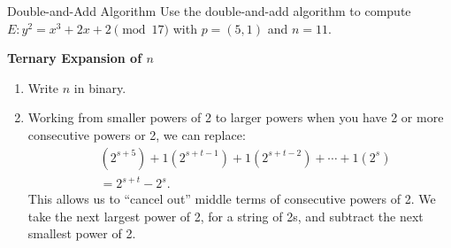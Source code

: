 \begin{example}
    {Double-and-Add Algorithm} Use the double-and-add algorithm to compute \(E \colon y^{2} = x^{3} + 2x + 2 \pmod{17}\) with \(p = (5,1)\) and \(n = 11\).
\end{example}


\begin{center}
\textbf{Ternary Expansion of \(n\)}
\end{center}

\begin{enumerate}
    \item Write \(n\) in binary.
    \item Working from smaller powers of 2 to larger powers when you have 2 or more consecutive powers or 2, we can replace: 
    \begin{align*}
        &(2^{s + 5}) + 1(2^{s + t - 1}) + 1(2^{s + t - 2}) + \cdots + 1(2^{s}) \\
        &= 2^{s + t} - 2^{s}.
    \end{align*}
    This allows us to ``cancel out'' middle terms of consecutive powers of 2. We take the next largest power of 2, for a string of 2s, and subtract the next smallest power of 2.
\end{enumerate}

